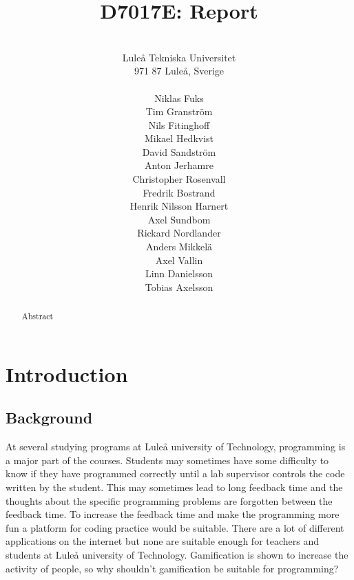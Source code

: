 \documentclass[a4paper,12pt]{article}
\title{D7017E: Report}
\begin{document}
\author{  \\ Luleå Tekniska Universitet\\ 
971 87 Luleå, Sverige\\  
\\ Niklas Fuks
\\ Tim Granström 
\\ Nils Fitinghoff 
\\ Mikael Hedkvist 
\\ David Sandström 
\\ Anton Jerhamre
\\ Christopher Rosenvall
\\ Fredrik Bostrand 
\\ Henrik Nilsson Harnert 
\\ Axel Sundbom 
\\ Rickard Nordlander 
\\ Anders Mikkelä 
\\ Axel Vallin
\\ Linn Danielsson
\\ Tobias Axelsson
}
\maketitle
\thispagestyle{empty}
\newpage
\thispagestyle{empty}  
 \setcounter{page}{1}
\newpage
\thispagestyle{empty}  
 \begin{abstract}
Abstract
 \end{abstract}
\newpage

\tableofcontents{}
\thispagestyle{empty}
 \setcounter{page}{2}
 
 \newpage
 \setcounter{page}{3}

\section{Introduction}
\subsection{Background} 
At several studying programs at Luleå university of Technology, programming is a major part of the courses. Students may sometimes have some difficulty to know if they have programmed correctly until a lab supervisor controls the code written by the student. This may sometimes lead to long feedback time and the thoughts about the specific programming problems are forgotten between the feedback time. To increase the feedback time and make the programming more fun a platform for coding practice would be suitable. There are a lot of different applications on the internet but none are suitable enough for teachers and students at Luleå university of Technology. Gamification is shown to increase the activity of people, so why shouldn't gamification be suitable for programming? 
\end{document}
